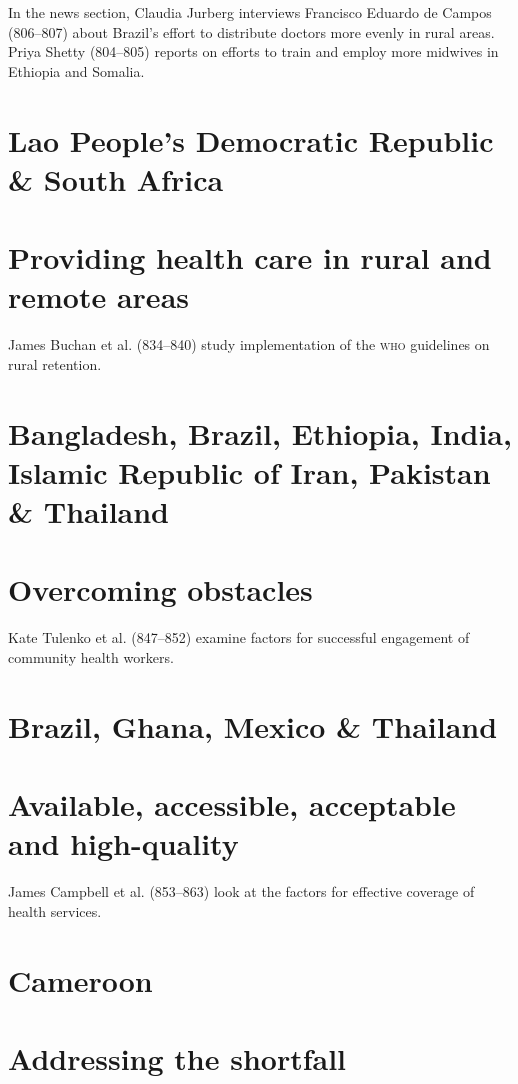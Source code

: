 \documentclass{article}
\begin{document}
In the news section, Claudia Jurberg interviews Francisco Eduardo de Campos
(806–807)
about Brazil's effort to distribute doctors more evenly in rural areas. Priya
Shetty
(804–805) reports on efforts to train and employ more midwives in Ethiopia and
Somalia.
\section{Lao People's Democratic Republic \& South Africa}

\section{Providing health care in rural and remote areas}

James Buchan et al. (834–840) study implementation of the \textsc{who} guidelines on
rural
retention.

\section{Bangladesh, Brazil, Ethiopia, India, Islamic Republic of Iran, Pakistan
\&
Thailand}

\section{Overcoming obstacles}

Kate Tulenko et al. (847–852) examine factors for successful engagement of
community
health workers.

\section{Brazil, Ghana, Mexico \& Thailand}

\section{Available, accessible, acceptable and high-quality}

James Campbell et al. (853–863) look at the factors for effective coverage of
health
services.

\section{Cameroon}

\section{Addressing the shortfall}
\end{document}
